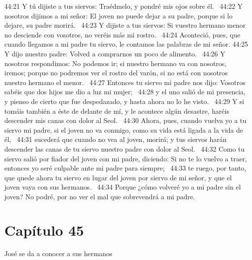 44:21 Y tú dijiste a tus siervos: Traédmelo, y pondré mis ojos sobre él.  
44:22 Y nosotros dijimos a mi señor: El joven no puede dejar a su padre, porque si lo dejare, su padre morirá.  
44:23 Y dijiste a tus siervos: Si vuestro hermano menor no desciende con vosotros, no veréis más mi rostro.  
44:24 Aconteció, pues, que cuando llegamos a mi padre tu siervo, le contamos las palabras de mi señor. 
44:25 Y dijo nuestro padre: Volved a comprarnos un poco de alimento.  
44:26 Y nosotros respondimos: No podemos ir; si nuestro hermano va con nosotros, iremos; porque no podremos ver el rostro del varón, si no está con nosotros nuestro hermano el menor.  
44:27 Entonces tu siervo mi padre nos dijo: Vosotros sabéis que dos hijos me dio a luz mi mujer;  
44:28 y el uno salió de mi presencia, y pienso de cierto que fue despedazado, y hasta ahora no lo he visto.  
44:29 Y si tomáis también a éste de delante de mí, y le acontece algún desastre, haréis descender mis canas con dolor al Seol.  
44:30 Ahora, pues, cuando vuelva yo a tu siervo mi padre, si el joven no va conmigo, como su vida está ligada a la vida de él,  
44:31 sucederá que cuando no vea al joven, morirá; y tus siervos harán descender las canas de tu siervo nuestro padre con dolor al Seol.  
44:32 Como tu siervo salió por fiador del joven con mi padre, diciendo: Si no te lo vuelvo a traer, entonces yo seré culpable ante mi padre para siempre;  
44:33 te ruego, por tanto, que quede ahora tu siervo en lugar del joven por siervo de mi señor, y que el joven vaya con sus hermanos.  
44:34 Porque ¿cómo volveré yo a mi padre sin el joven? No podré, por no ver el mal que sobrevendrá a mi padre.  
\section*{Capítulo 45}
José se da a conocer a sus hermanos  


